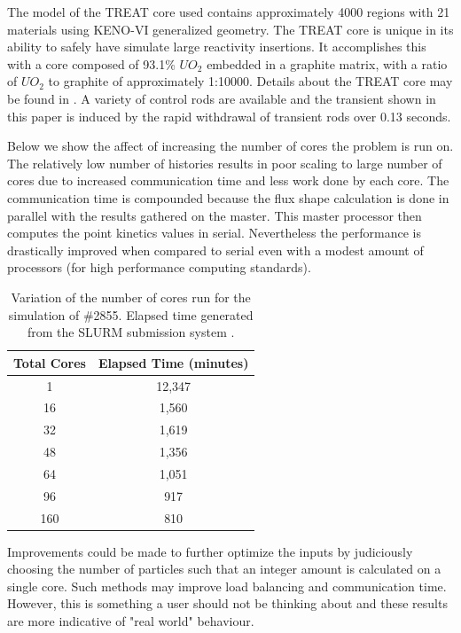 \documentclass{anstrans}
\begin{document}
The model of the TREAT core used contains approximately 4000 regions with 21 materials using KENO-VI generalized geometry.  The TREAT core is unique in its ability to safely have simulate large reactivity insertions.  It accomplishes this with a core composed of 93.1\% $UO_2$ embedded in a graphite matrix, with a ratio of $UO_2$ to graphite of approximately 1:10000.  Details about the TREAT core may be found in \cite{bess2015baseline}.  A variety of control rods are available and the transient shown in this paper is induced by the rapid withdrawal of transient rods over 0.13 seconds. 

Below we show the affect of increasing the number of cores the problem is run on.  The relatively low number of histories results in poor scaling to large number of cores due to increased communication time and less work done by each core.  The communication time is compounded because the flux shape calculation is done in parallel with the results gathered on the master.  This master processor then computes the point kinetics values in serial.  Nevertheless the performance is drastically improved when compared to serial even with a modest amount of processors (for high performance computing standards).  
\begin{table}[h]
    \centering
    \begin{tabular}{c|c}
                    Total Cores  & Elapsed Time (minutes) \\
                    \hline 
                    1                  &   12,347            \\
                    16                 &   1,560             \\
                    32                 &   1,619              \\
                    48                 &   1,356              \\
                    64                 &   1,051             \\
                    96                 &   917             \\
                    160                &   810             \\
                    \hline
    \end{tabular}
    \caption{Variation of the number of cores run for the simulation of \#2855. Elapsed time generated from the SLURM submission system \cite{yoo2003slurm}. }
    \label{tab:parallel}
\end{table}
Improvements could be made to further optimize the inputs by judiciously choosing the number of particles such that an integer amount is calculated on a single core.  Such methods may improve load balancing and communication time.  However, this is something a user should not be thinking about and these results are more indicative of "real world" behaviour.
\end{document}
